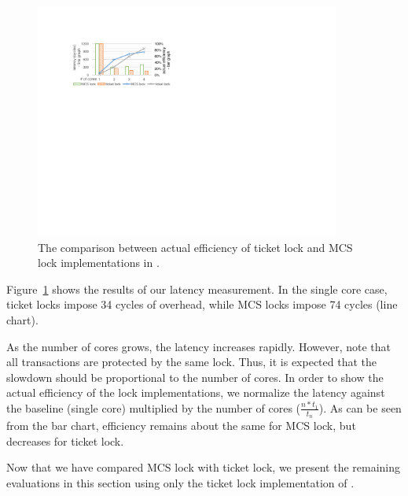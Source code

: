 \begin{figure}\centering
	\hspace{-.2cm}
	\includegraphics[width=10cm]{figs/locks.pdf}
	\hspace{-.2cm}
	\caption{The comparison between actual efficiency of ticket lock and MCS lock implementations in \cCTOS{}.}
	\label{fig:locks}
\vspace*{-10pt}        
\end{figure}

Figure~\ref{fig:locks} shows the results of our latency
measurement. In the single core case, ticket locks impose 34 cycles of
overhead, while MCS locks impose 74 cycles (line chart).
As the number of cores grows, the latency increases rapidly. However,
note that all transactions are protected by the same lock. Thus, it is
expected that the slowdown should be proportional to the number of
cores. In order to show the actual efficiency of the lock
implementations, we normalize the latency against the baseline (single
core) multiplied by the number of cores ($\frac{n*t_1}{t_n}$). As can
be seen from the bar chart, efficiency remains about the same for MCS
lock, but decreases for ticket lock.

Now that we have compared MCS lock with ticket lock, we present the
remaining evaluations in this section using only the ticket lock
implementation of \cCTOS{}.

